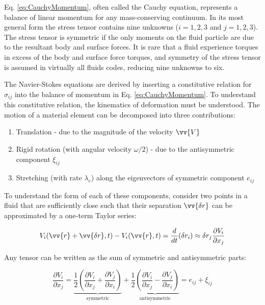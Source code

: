 \documentclass[10pt]{article}
\numberwithin{equation}{section} %
\begin{document}
Eq. \eqref{eq:CauchyMomentum}, often called the Cauchy equation, represents a balance of linear momentum for any mass-conserving continuum. In its most general form the stress tensor contains nine unknowns (\(i=1, 2, 3\) and \(j=1, 2, 3\)). The stress tensor is symmetric if the only moments on the fluid particle are due to the resultant body and surface forces. It is rare that a fluid experience torques in excess of the body and surface force torques, and symmetry of the stress tensor is assumed in virtually all fluids codes, reducing nine unknowns to six. 

The Navier-Stokes equations are derived by inserting a constitutive relation for \(\sigma_{ij}\) into the balance of momentum in Eq. \eqref{eq:CauchyMomentum}. To understand this constitutive relation, the kinematics of deformation must be understood. The motion of a material element can be decomposed into three contributions:

\begin{enumerate}
\item Translation - due to the magnitude of the velocity \(\vv{V}\)
\item Rigid rotation (with angular velocity \(\omega/2\)) - due to the antisymmetric component \(\xi_{ij}\)
\item Stretching (with rate \(\lambda_e\)) along the eigenvectors of symmetric component \(e_{ij}\)
\end{enumerate}

To understand the form of each of these components, consider two points in a fluid that are sufficiently close such that their separation \(\vv{\delta r}\) can be approximated by a one-term Taylor series:

\begin{equation}
\label{eq:FirstOrderTS}
V_i(\vv{r}+\vv{\delta r}, t)-V_i(\vv{r},t)=\frac{d}{dt}(\delta r_i)\approx\delta r_j\frac{\partial V_i}{\partial x_j}
\end{equation}

Any tensor can be written as the sum of symmetric and antisymmetric parts:

\begin{equation}
\label{eq:VelocitySymmetricAntisymmetric}
\frac{\partial V_i}{\partial x_j}=\underbrace{\frac{1}{2}\left(\frac{\partial V_i}{\partial x_j}+\frac{\partial V_j}{\partial x_i}\right)}_\text{symmetric}+\underbrace{\frac{1}{2}\left(\frac{\partial V_i}{\partial x_j}-\frac{\partial V_j}{\partial x_i}\right)}_\text{antisymmetric}=e_{ij}+\xi_{ij}
\end{equation}
\end{document}
